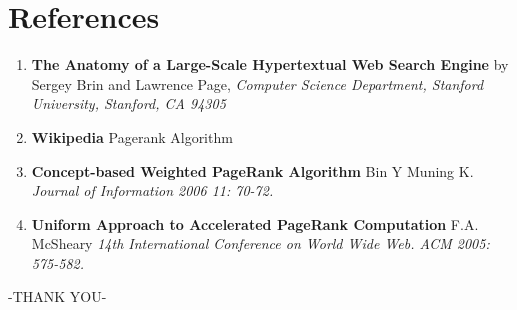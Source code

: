 \documentclass[10pt,a4paper]{article}
\begin{document}
\section{References}
\begin{enumerate}
  \item \textbf{The Anatomy of a Large-Scale Hypertextual Web Search Engine} by Sergey Brin and Lawrence Page, \textit{Computer Science Department, Stanford University, Stanford, CA 94305}
  \item \textbf{Wikipedia} Pagerank Algorithm
  \item \textbf{Concept-based Weighted PageRank Algorithm} Bin Y Muning K. \textit{Journal of Information 2006 11: 70-72.}
  \item \textbf{Uniform Approach to Accelerated PageRank Computation} F.A. McSheary \textit{14th International Conference on World Wide Web. ACM 2005: 575-582. }
\end{enumerate}
\vspace{5cm}
\huge
\centering
-THANK YOU-
\end{document}
